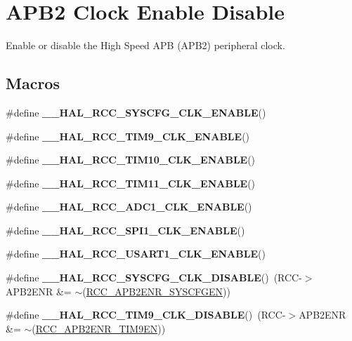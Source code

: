 \hypertarget{group___r_c_c___a_p_b2___clock___enable___disable}{\section{A\-P\-B2 Clock Enable Disable}
\label{group___r_c_c___a_p_b2___clock___enable___disable}
}


Enable or disable the High Speed A\-P\-B (A\-P\-B2) peripheral clock.  


\subsection*{Macros}
\begin{DoxyCompactItemize}
\item 
\#define {\bfseries \-\_\-\-\_\-\-H\-A\-L\-\_\-\-R\-C\-C\-\_\-\-S\-Y\-S\-C\-F\-G\-\_\-\-C\-L\-K\-\_\-\-E\-N\-A\-B\-L\-E}()
\item 
\#define {\bfseries \-\_\-\-\_\-\-H\-A\-L\-\_\-\-R\-C\-C\-\_\-\-T\-I\-M9\-\_\-\-C\-L\-K\-\_\-\-E\-N\-A\-B\-L\-E}()
\item 
\#define {\bfseries \-\_\-\-\_\-\-H\-A\-L\-\_\-\-R\-C\-C\-\_\-\-T\-I\-M10\-\_\-\-C\-L\-K\-\_\-\-E\-N\-A\-B\-L\-E}()
\item 
\#define {\bfseries \-\_\-\-\_\-\-H\-A\-L\-\_\-\-R\-C\-C\-\_\-\-T\-I\-M11\-\_\-\-C\-L\-K\-\_\-\-E\-N\-A\-B\-L\-E}()
\item 
\#define {\bfseries \-\_\-\-\_\-\-H\-A\-L\-\_\-\-R\-C\-C\-\_\-\-A\-D\-C1\-\_\-\-C\-L\-K\-\_\-\-E\-N\-A\-B\-L\-E}()
\item 
\#define {\bfseries \-\_\-\-\_\-\-H\-A\-L\-\_\-\-R\-C\-C\-\_\-\-S\-P\-I1\-\_\-\-C\-L\-K\-\_\-\-E\-N\-A\-B\-L\-E}()
\item 
\#define {\bfseries \-\_\-\-\_\-\-H\-A\-L\-\_\-\-R\-C\-C\-\_\-\-U\-S\-A\-R\-T1\-\_\-\-C\-L\-K\-\_\-\-E\-N\-A\-B\-L\-E}()
\item 
\hypertarget{group___r_c_c___a_p_b2___clock___enable___disable_gaf04a5f1f0d6d8577706022a866f4528e}{\#define {\bfseries \-\_\-\-\_\-\-H\-A\-L\-\_\-\-R\-C\-C\-\_\-\-S\-Y\-S\-C\-F\-G\-\_\-\-C\-L\-K\-\_\-\-D\-I\-S\-A\-B\-L\-E}()~(R\-C\-C-\/$>$A\-P\-B2\-E\-N\-R \&= $\sim$(\hyperlink{group___peripheral___registers___bits___definition_ga7a9d56a8aa1fa0f519ecbdf0d19dd4da}{R\-C\-C\-\_\-\-A\-P\-B2\-E\-N\-R\-\_\-\-S\-Y\-S\-C\-F\-G\-E\-N}))}\label{group___r_c_c___a_p_b2___clock___enable___disable_gaf04a5f1f0d6d8577706022a866f4528e}

\item 
\hypertarget{group___r_c_c___a_p_b2___clock___enable___disable_ga6c858a3c7df429051fe4459a8a22da43}{\#define {\bfseries \-\_\-\-\_\-\-H\-A\-L\-\_\-\-R\-C\-C\-\_\-\-T\-I\-M9\-\_\-\-C\-L\-K\-\_\-\-D\-I\-S\-A\-B\-L\-E}()~(R\-C\-C-\/$>$A\-P\-B2\-E\-N\-R \&= $\sim$(\hyperlink{group___peripheral___registers___bits___definition_ga987ebd8255dc8f9c09127e1d608d1065}{R\-C\-C\-\_\-\-A\-P\-B2\-E\-N\-R\-\_\-\-T\-I\-M9\-E\-N}))}\label{group___r_c_c___a_p_b2___clock___enable___disable_ga6c858a3c7df429051fe4459a8a22da43}


\end{DoxyCompactItemize}
